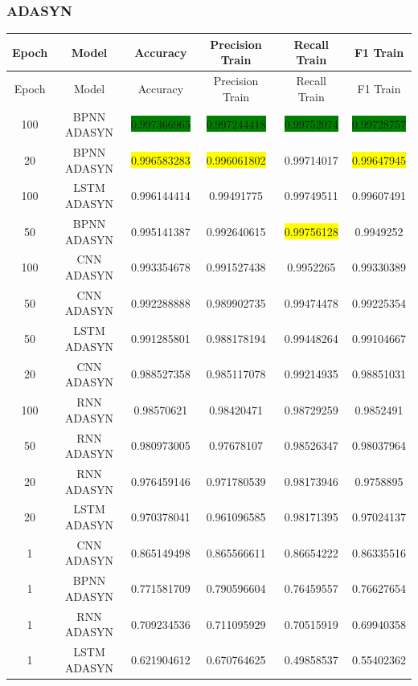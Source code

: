\subsubsection{ADASYN}
\begin{longtable}{|c|c|c|c|c|c|}
	\hline
	Epoch & Model & Accuracy & Precision Train & Recall Train & F1 Train\\ \hline
	\endfirsthead
	\hline
	Epoch & Model & Accuracy & Precision Train & Recall Train & F1 Train\\ \hline
	\endhead
	100 & BPNN ADASYN & \colorbox{green}{0.997366965} & \colorbox{green}{0.997244418} & \colorbox{green}{0.99752074} & \colorbox{green}{0.99728757}\\ \hline
	20 & BPNN ADASYN & \colorbox{yellow}{0.996583283} & \colorbox{yellow}{0.996061802} & 0.99714017 & \colorbox{yellow}{0.99647945}\\ \hline
	100 & LSTM ADASYN & 0.996144414 & 0.99491775 & 0.99749511 & 0.99607491\\ \hline
	50 & BPNN ADASYN & 0.995141387 & 0.992640615 & \colorbox{yellow}{0.99756128} & 0.9949252\\ \hline
	100 & CNN ADASYN & 0.993354678 & 0.991527438 & 0.9952265 & 0.99330389\\ \hline
	50 & CNN ADASYN & 0.992288888 & 0.989902735 & 0.99474478 & 0.99225354\\ \hline
	50 & LSTM ADASYN & 0.991285801 & 0.988178194 & 0.99448264 & 0.99104667\\ \hline
	20 & CNN ADASYN & 0.988527358 & 0.985117078 & 0.99214935 & 0.98851031\\ \hline
	100 & RNN ADASYN & 0.98570621 & 0.98420471 & 0.98729259 & 0.9852491\\ \hline
	50 & RNN ADASYN & 0.980973005 & 0.97678107 & 0.98526347 & 0.98037964\\ \hline
	20 & RNN ADASYN & 0.976459146 & 0.971780539 & 0.98173946 & 0.9758895\\ \hline
	20 & LSTM ADASYN & 0.970378041 & 0.961096585 & 0.98171395 & 0.97024137\\ \hline
	1 & CNN ADASYN & 0.865149498 & 0.865566611 & 0.86654222 & 0.86335516\\ \hline
	1 & BPNN ADASYN & 0.771581709 & 0.790596604 & 0.76459557 & 0.76627654\\ \hline
	1 & RNN ADASYN & 0.709234536 & 0.711095929 & 0.70515919 & 0.69940358\\ \hline
	1 & LSTM ADASYN & 0.621904612 & 0.670764625 & 0.49858537 & 0.55402362\\ \hline

\end{longtable}
